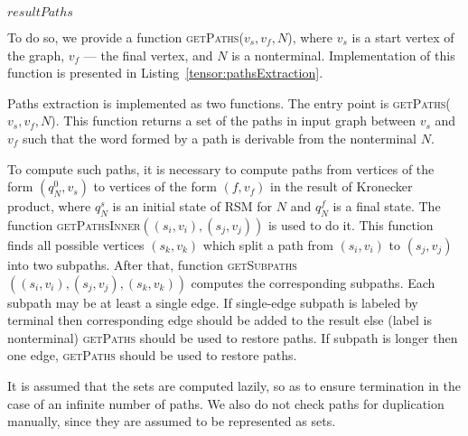 \begin{algorithm}[h]
\begin{algorithmic}[1]
     		
     			\Else
     			\EndIf
     		\EndFor
     	\EndFor   
    \EndFor
    \State \Return $resultPaths$
\EndFunction
\end{algorithmic}
\end{algorithm}

To do so, we provide a function \textsc{getPaths}($v_s, v_f, N$), where $v_s$ is a start vertex of the graph, $v_f$ --- the final vertex, and $N$ is a nonterminal.
Implementation of this function is presented in Listing~\ref{tensor:pathsExtraction}.

Paths extraction is implemented as two functions.
The entry point is \textsc{getPaths}($v_s, v_f, N$).
This function returns a set of the paths in input graph between $v_s$ and $v_f$ such that the word formed by a path is derivable from the nonterminal $N$.

To compute such paths, it is necessary to compute paths from vertices of the form $(q_N^0,v_s)$ to vertices of the form $(f, v_f)$ in the result of Kronecker product, where $q_N^s$ is an initial state of RSM for $N$ and $q_N^f$ is a final state.
The function \textsc{getPathsInner}$((s_i,v_i),(s_j,v_j))$ is used to do it.
This function finds all possible vertices $(s_k,v_k)$  which split a path from $(s_i,v_i)$ to $(s_j,v_j)$ into two subpaths.
After that, function \textsc{getSubpaths}$((s_i,v_i),(s_j,v_j),(s_k,v_k))$ computes the corresponding subpaths.
Each subpath may be at least a single edge.
If single-edge subpath is labeled by terminal then corresponding edge should be added to the result else (label is nonterminal) \textsc{getPaths} should be used to restore paths.
If subpath is longer then one edge, \textsc{getPaths} should be used to restore paths. 

It is assumed that the sets are computed lazily, so as to ensure termination in the case of an infinite number of paths.
We also do not check paths for duplication manually, since they are assumed to be represented as sets.
